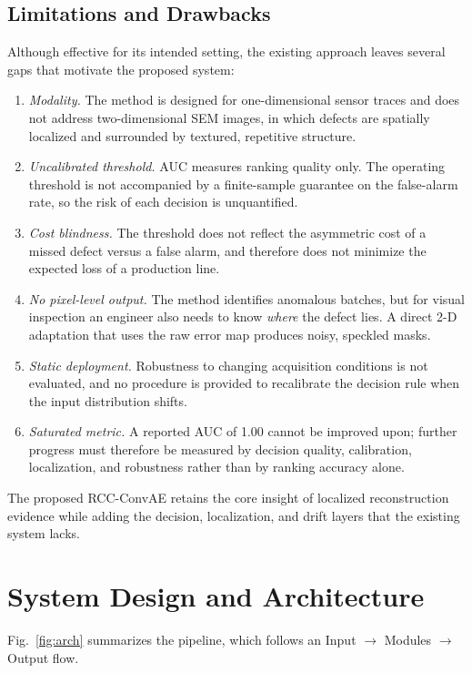 \documentclass[conference]{IEEEtran}
\begin{document}
\subsection{Limitations and Drawbacks}
Although effective for its intended setting, the existing approach leaves several gaps that motivate the proposed system:
\begin{enumerate}
\item \emph{Modality.} The method is designed for one-dimensional sensor traces and does not address two-dimensional SEM images, in which defects are spatially localized and surrounded by textured, repetitive structure.
\item \emph{Uncalibrated threshold.} AUC measures ranking quality only. The operating threshold is not accompanied by a finite-sample guarantee on the false-alarm rate, so the risk of each decision is unquantified.
\item \emph{Cost blindness.} The threshold does not reflect the asymmetric cost of a missed defect versus a false alarm, and therefore does not minimize the expected loss of a production line.
\item \emph{No pixel-level output.} The method identifies anomalous batches, but for visual inspection an engineer also needs to know \emph{where} the defect lies. A direct 2-D adaptation that uses the raw error map produces noisy, speckled masks.
\item \emph{Static deployment.} Robustness to changing acquisition conditions is not evaluated, and no procedure is provided to recalibrate the decision rule when the input distribution shifts.
\item \emph{Saturated metric.} A reported AUC of 1.00 cannot be improved upon; further progress must therefore be measured by decision quality, calibration, localization, and robustness rather than by ranking accuracy alone.
\end{enumerate}
The proposed RCC-ConvAE retains the core insight of localized reconstruction evidence while adding the decision, localization, and drift layers that the existing system lacks.

\section{System Design and Architecture}
Fig.~\ref{fig:arch} summarizes the pipeline, which follows an Input $\rightarrow$ Modules $\rightarrow$ Output flow.
\end{document}
